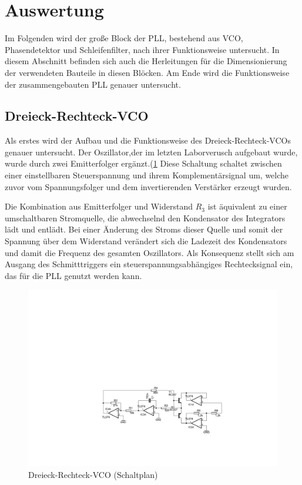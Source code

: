 \section{Auswertung}

Im Folgenden wird der große Block der PLL, bestehend aus VCO, Phasendetektor und Schleifenfilter, nach ihrer Funktionsweise untersucht. In diesem Abschnitt befinden sich auch die Herleitungen für die Dimensionierung der verwendeten Bauteile in diesen Blöcken. Am Ende wird die Funktionsweise der zusammengebauten PLL genauer untersucht.

\subsection{Dreieck-Rechteck-VCO}

Als erstes wird der Aufbau und die Funktionsweise des Dreieck-Rechteck-VCOs genauer untersucht. Der Oszillator,der im letzten Laborverusch aufgebaut wurde, wurde durch zwei Emitterfolger ergänzt.(\ref{fig:VCO_Schaltung} Diese Schaltung schaltet zwischen einer einstellbaren Steuerspannung und ihrem Komplementärsignal um, welche zuvor vom Spannungsfolger und dem invertierenden Verstärker erzeugt wurden.

Die Kombination aus Emitterfolger und Widerstand $R_3$ ist äquivalent zu einer umschaltbaren Stromquelle, die abwechselnd den Kondensator des Integrators lädt und entlädt. Bei einer Änderung des Stroms dieser Quelle und somit der Spannung über dem Widerstand verändert sich die Ladezeit des Kondensators und damit die Frequenz des gesamten Oszillators. Als Konsequenz stellt sich am Ausgang des Schmitttriggers ein steuerspannungsabhängiges Rechtecksignal ein, das für die PLL genutzt werden kann.
\begin{figure}[H]
  \centering
  \includegraphics[width=1\linewidth]{Elektronik-Laborprotokoll_PLL/Abbildungen/VCO_Schaltung.pdf}
  \caption{Dreieck-Rechteck-VCO (Schaltplan)}
  \label{fig:VCO_Schaltung}
\end{figure}



